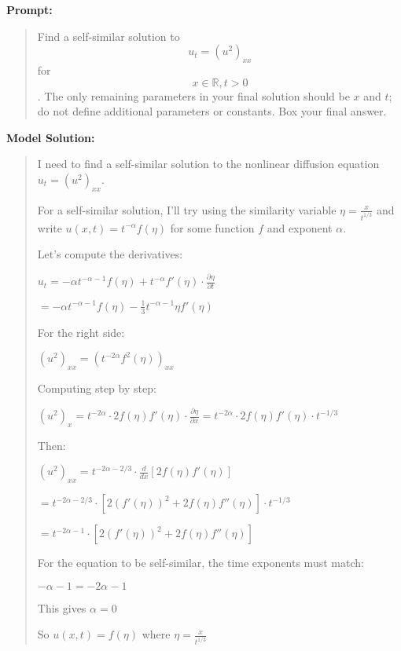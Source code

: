 \documentclass{article}
\begin{document}
\textbf{Prompt:}
\begin{quote}
Find a self-similar solution to $$u_t=(u^2)_{xx}$$ for $$x\in \mathbb{R}, t>0$$. The only remaining parameters in your final solution should be $x$ and $t$; do not define additional parameters or constants. Box your final answer.
\end{quote}
\textbf{Model Solution:}
\begin{quote}
I need to find a self-similar solution to the nonlinear diffusion equation $u_t = (u^2)_{xx}$.



For a self-similar solution, I'll try using the similarity variable $\eta = \frac{x}{t^{1/3}}$ and write $u(x,t) = t^{-\alpha} f(\eta)$ for some function $f$ and exponent $\alpha$.



Let's compute the derivatives:



$u_t = -\alpha t^{-\alpha-1} f(\eta) + t^{-\alpha} f'(\eta) \cdot \frac{\partial \eta}{\partial t}$

$= -\alpha t^{-\alpha-1} f(\eta) - \frac{1}{3}t^{-\alpha-1} \eta f'(\eta)$



For the right side:

$(u^2)_{xx} = (t^{-2\alpha} f^2(\eta))_{xx}$



Computing step by step:

$(u^2)_x = t^{-2\alpha} \cdot 2f(\eta)f'(\eta) \cdot \frac{\partial \eta}{\partial x} = t^{-2\alpha} \cdot 2f(\eta)f'(\eta) \cdot t^{-1/3}$



Then:

$(u^2)_{xx} = t^{-2\alpha-2/3} \cdot \frac{d}{dx}[2f(\eta)f'(\eta)]$

$= t^{-2\alpha-2/3} \cdot [2(f'(\eta))^2 + 2f(\eta)f''(\eta)] \cdot t^{-1/3}$

$= t^{-2\alpha-1} \cdot [2(f'(\eta))^2 + 2f(\eta)f''(\eta)]$



For the equation to be self-similar, the time exponents must match:

$-\alpha-1 = -2\alpha-1$

This gives $\alpha = 0$



So $u(x,t) = f(\eta)$ where $\eta = \frac{x}{t^{1/3}}$




\end{quote}
\end{document}
